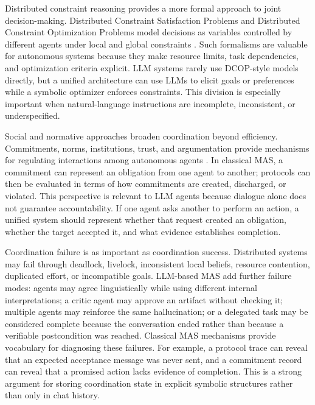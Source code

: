 Distributed constraint reasoning provides a more formal approach to joint decision-making. Distributed Constraint Satisfaction Problems and Distributed Constraint Optimization Problems model decisions as variables controlled by different agents under local and global constraints \cite{yokoo1998distributed,modi2005adopt,fioretto2018distributed}. Such formalisms are valuable for autonomous systems because they make resource limits, task dependencies, and optimization criteria explicit. LLM systems rarely use DCOP-style models directly, but a unified architecture can use LLMs to elicit goals or preferences while a symbolic optimizer enforces constraints. This division is especially important when natural-language instructions are incomplete, inconsistent, or underspecified.

Social and normative approaches broaden coordination beyond efficiency. Commitments, norms, institutions, trust, and argumentation provide mechanisms for regulating interactions among autonomous agents \cite{singh1999commitments,dignum2004model,rahwan2009argumentation}. In classical MAS, a commitment can represent an obligation from one agent to another; protocols can then be evaluated in terms of how commitments are created, discharged, or violated. This perspective is relevant to LLM agents because dialogue alone does not guarantee accountability. If one agent asks another to perform an action, a unified system should represent whether that request created an obligation, whether the target accepted it, and what evidence establishes completion.

Coordination failure is as important as coordination success. Distributed systems may fail through deadlock, livelock, inconsistent local beliefs, resource contention, duplicated effort, or incompatible goals. LLM-based MAS add further failure modes: agents may agree linguistically while using different internal interpretations; a critic agent may approve an artifact without checking it; multiple agents may reinforce the same hallucination; or a delegated task may be considered complete because the conversation ended rather than because a verifiable postcondition was reached. Classical MAS mechanisms provide vocabulary for diagnosing these failures. For example, a protocol trace can reveal that an expected acceptance message was never sent, and a commitment record can reveal that a promised action lacks evidence of completion. This is a strong argument for storing coordination state in explicit symbolic structures rather than only in chat history.


